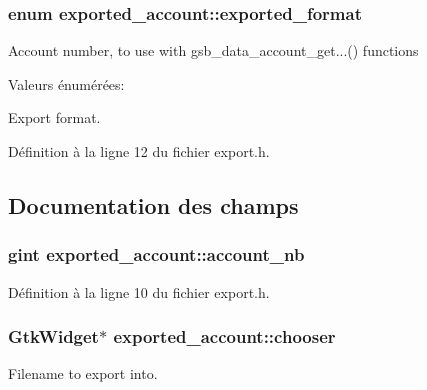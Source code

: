 \subsubsection[{exported\_\-format}]{\setlength{\rightskip}{0pt plus 5cm}enum {\bf exported\_\-account::exported\_\-format}}\label{structexported__account_a226bd49d6fafaa77a45581dc085c6b0f}
Account number, to use with gsb\_\-data\_\-account\_\-get...() functions \begin{Desc}
\item[Valeurs énumérées: ]\par
\begin{description}
\item[{\em 
EXPORT\_\-QIF\label{structexported__account_a226bd49d6fafaa77a45581dc085c6b0fad26948249f3b07b87e049db6c69c3bcc}
}]Export format. \item[{\em 
EXPORT\_\-CSV\label{structexported__account_a226bd49d6fafaa77a45581dc085c6b0fa4a9ca4ff8217a2a37b7208f96402da32}
}]\end{description}
\end{Desc}



Définition à la ligne 12 du fichier export.h.



\subsection{Documentation des champs}
\subsubsection[{account\_\-nb}]{\setlength{\rightskip}{0pt plus 5cm}gint {\bf exported\_\-account::account\_\-nb}}\label{structexported__account_ac3432f073ad78bbc31ecaa15a2b6e358}


Définition à la ligne 10 du fichier export.h.

\subsubsection[{chooser}]{\setlength{\rightskip}{0pt plus 5cm}GtkWidget$\ast$ {\bf exported\_\-account::chooser}}\label{structexported__account_ae7d68fd01cbbfd8a1adaec55bd1c8ddc}
Filename to export into. 

